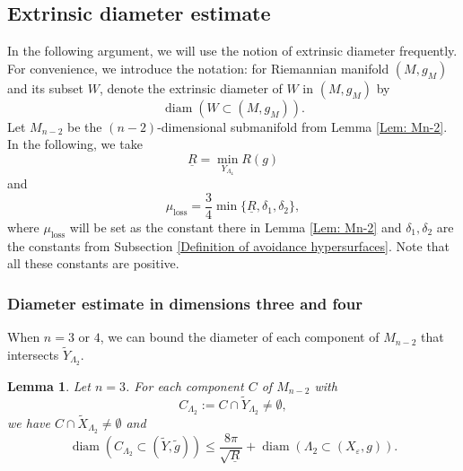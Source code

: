 \documentclass[11pt,letterpaper]{amsart}
\numberwithin{equation}{section}
\newtheorem{lemma}[theorem]{Lemma}
\theoremstyle{definition}
\DeclareMathOperator{\diam}{diam}
\newcommand{\ve}{\varepsilon}
\begin{document}
\subsection{Extrinsic diameter estimate}\label{Extrinsic diameter estimate}
In the following argument, we will use the notion of extrinsic diameter frequently.
For convenience, we introduce the notation: for Riemannian manifold $(M,g_{M})$ and its subset $W$, denote the extrinsic diameter of $W$ in $(M,g_{M})$ by
\[
\diam(W\subset(M,g_{M})).
\]
Let $M_{n-2}$ be the $(n-2)$-dimensional submanifold from Lemma \ref{Lem: Mn-2}. In the following, we take
$$
\underline R=\min_{Y_{\Lambda_4}} R(g)
$$
and
$$
\mu_{\mathrm{loss}}=\frac{3}{4}\min\{\underline R,\delta_1,\delta_2\},
$$
where {$\mu_{\mathrm{loss}}$ will be set as the constant there in Lemma \ref{Lem: Mn-2}} and $\delta_1,\delta_2$ are the constants from Subsection \ref{Definition of avoidance hypersurfaces}. Note that all these constants are positive.


\subsubsection{Diameter estimate in dimensions three and four}
When $n=3$ or $4$, we can bound the diameter of each component of $M_{n-2}$ that intersects $\tilde Y_{\Lambda_2}$.

\begin{lemma}\label{Lem: 3D}
Let $n=3$. For each component $C$ of $M_{n-2}$ with
$$C_{\Lambda_2}:=C\cap\tilde Y_{\Lambda_2}\neq \emptyset,$$
we have $C\cap \tilde X_{\Lambda_2}\neq \emptyset$ and $$
\diam(C_{\Lambda_2}\subset (\tilde Y,\tilde g))\leq \frac{8\pi}{\sqrt{\underline R}}+\diam(\Lambda_2\subset(X_\ve,g)).
$$
\end{lemma}
\end{document}
